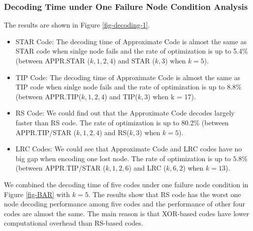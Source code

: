 \documentclass[sigconf]{acmart}
\begin{document}
\subsubsection{Decoding Time under One Failure Node Condition Analysis}
The results are shown in Figure \ref{fig-decoding-1}.
\begin{itemize}
    \item STAR Code: The decoding time of Approximate Code is almost the same as STAR code when sinlge node fails and the rate of optimization is up to 5.4\% (between APPR.STAR ($k,1,2,4$) and STAR ($k,3$) when $k = 5$).
    \item TIP Code: The decoding time of Approximate Code is almost the same as TIP code when sinlge node fails and the rate of optimization is up to 8.8\% (between APPR.TIP($k,1,2,4$) and TIP($k,3$) when k = 17).
    \item RS Code: We could find out that the Approximate Code decodes largely faster than RS code. The rate of optimization is up to 80.2\% (between APPR.TIP/STAR ($k,1,2,4$) and RS($k,3$) when $k = 5$).
    \item LRC Codes: We could see that Approximate Code and LRC codes have no big gap when encoding one lost node. The rate of optimization is up to $5.8\%$ (between APPR.TIP/STAR ($k,1,2,6$) and LRC ($k, 6, 2$) when $k = 13$).
\end{itemize}

We combined the decoding time of five codes under one failure node condition in Figure \ref{fig-BAR} with $k=5$. The results show that RS code has the worst one node decoding performance among five codes and the performance of other four codes are almost the same. The main reason is that XOR-based codes have lower computational overhead than RS-based codes.\par
\end{document}

